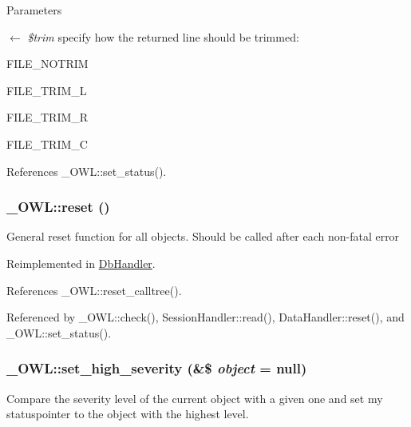 \begin{DoxyParams}{Parameters}
\item[\mbox{$\leftarrow$} {\em \$trim}]specify how the returned line should be trimmed:
\begin{DoxyItemize}
\item FILE\_\-NOTRIM
\item FILE\_\-TRIM\_\-L
\item FILE\_\-TRIM\_\-R
\item FILE\_\-TRIM\_\-C 
\end{DoxyItemize}\end{DoxyParams}


References \_\-OWL::set\_\-status().

\subsubsection[{reset}]{\setlength{\rightskip}{0pt plus 5cm}\_\-OWL::reset ()}\label{class__OWL_a2f2a042bcf31965194c03033df0edc9b}
General reset function for all objects. Should be called after each non-\/fatal error 

Reimplemented in \hyperlink{classDbHandler_a9982df4830f05803935bb31bac7fae3d}{DbHandler}.



References \_\-OWL::reset\_\-calltree().



Referenced by \_\-OWL::check(), SessionHandler::read(), DataHandler::reset(), and \_\-OWL::set\_\-status().

\subsubsection[{set\_\-high\_\-severity}]{\setlength{\rightskip}{0pt plus 5cm}\_\-OWL::set\_\-high\_\-severity (\&\$ {\em object} = {\ttfamily null})}\label{class__OWL_a576829692a3b66e3d518853bf43abae3}
Compare the severity level of the current object with a given one and set my statuspointer to the object with the highest level. 

